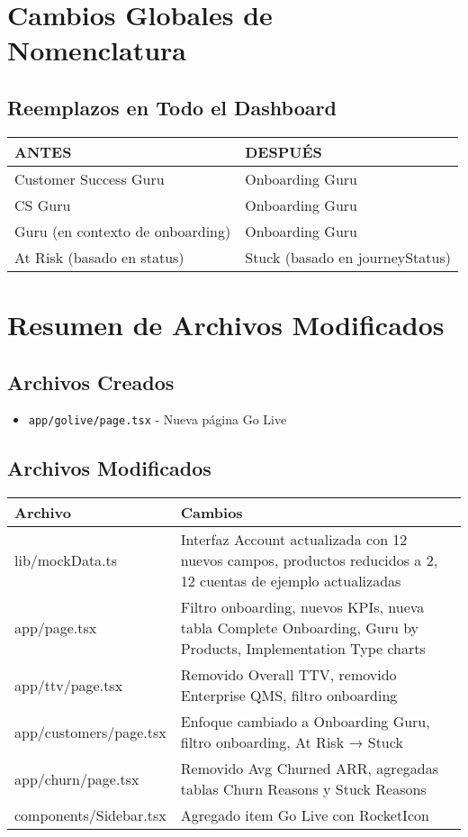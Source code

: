 \documentclass[12pt,a4paper]{article}
\begin{document}
\section{Cambios Globales de Nomenclatura}

\subsection{Reemplazos en Todo el Dashboard}

\begin{longtable}{|p{6cm}|p{6cm}|}
\hline
\textbf{ANTES} & \textbf{DESPUÉS} \\
\hline
\endhead
Customer Success Guru & Onboarding Guru \\
\hline
CS Guru & Onboarding Guru \\
\hline
Guru (en contexto de onboarding) & Onboarding Guru \\
\hline
At Risk (basado en status) & Stuck (basado en journeyStatus) \\
\hline
\end{longtable}

\section{Resumen de Archivos Modificados}

\subsection{Archivos Creados}
\begin{itemize}
    \item \texttt{app/golive/page.tsx} - Nueva página Go Live
\end{itemize}

\subsection{Archivos Modificados}

\begin{longtable}{|p{5cm}|p{9cm}|}
\hline
\textbf{Archivo} & \textbf{Cambios} \\
\hline
\endhead
lib/mockData.ts & Interfaz Account actualizada con 12 nuevos campos, productos reducidos a 2, 12 cuentas de ejemplo actualizadas \\
\hline
app/page.tsx & Filtro onboarding, nuevos KPIs, nueva tabla Complete Onboarding, Guru by Products, Implementation Type charts \\
\hline
app/ttv/page.tsx & Removido Overall TTV, removido Enterprise QMS, filtro onboarding \\
\hline
app/customers/page.tsx & Enfoque cambiado a Onboarding Guru, filtro onboarding, At Risk → Stuck \\
\hline
app/churn/page.tsx & Removido Avg Churned ARR, agregadas tablas Churn Reasons y Stuck Reasons \\
\hline
components/Sidebar.tsx & Agregado item Go Live con RocketIcon \\
\hline
\end{longtable}
\end{document}
